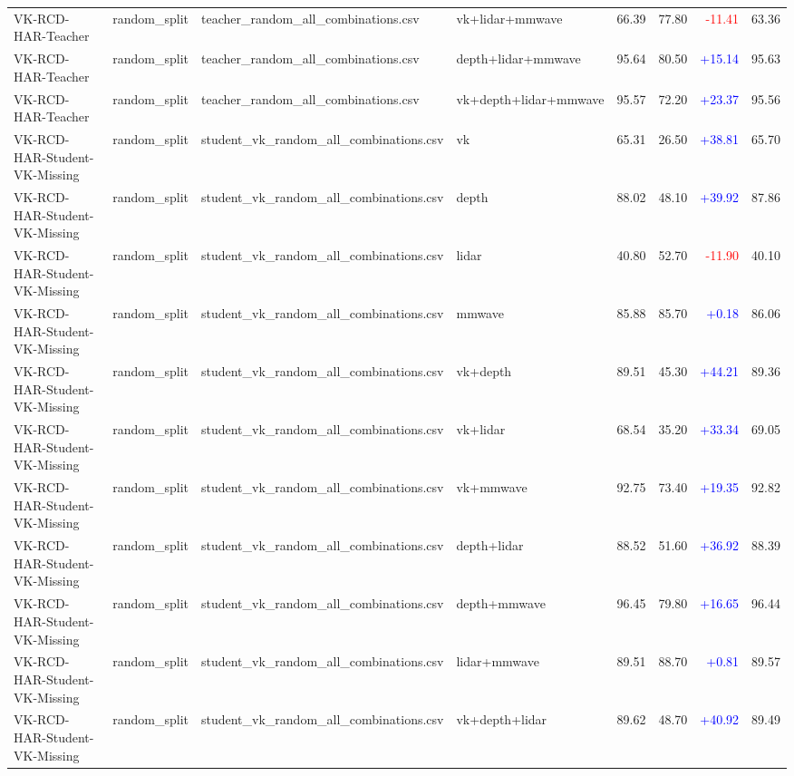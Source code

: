 \documentclass[10pt]{article}
\begin{document}
\begin{longtable}{llllrrrr}
VK-RCD-HAR-Teacher & random\_split & teacher\_random\_all\_combinations.csv & vk+lidar+mmwave & 66.39 & 77.80 & \textcolor{red}{-11.41} & 63.36\\
VK-RCD-HAR-Teacher & random\_split & teacher\_random\_all\_combinations.csv & depth+lidar+mmwave & 95.64 & 80.50 & \textcolor{blue}{+15.14} & 95.63\\
VK-RCD-HAR-Teacher & random\_split & teacher\_random\_all\_combinations.csv & vk+depth+lidar+mmwave & 95.57 & 72.20 & \textcolor{blue}{+23.37} & 95.56\\
VK-RCD-HAR-Student-VK-Missing & random\_split & student\_vk\_random\_all\_combinations.csv & vk & 65.31 & 26.50 & \textcolor{blue}{+38.81} & 65.70\\
VK-RCD-HAR-Student-VK-Missing & random\_split & student\_vk\_random\_all\_combinations.csv & depth & 88.02 & 48.10 & \textcolor{blue}{+39.92} & 87.86\\
VK-RCD-HAR-Student-VK-Missing & random\_split & student\_vk\_random\_all\_combinations.csv & lidar & 40.80 & 52.70 & \textcolor{red}{-11.90} & 40.10\\
VK-RCD-HAR-Student-VK-Missing & random\_split & student\_vk\_random\_all\_combinations.csv & mmwave & 85.88 & 85.70 & \textcolor{blue}{+0.18} & 86.06\\
VK-RCD-HAR-Student-VK-Missing & random\_split & student\_vk\_random\_all\_combinations.csv & vk+depth & 89.51 & 45.30 & \textcolor{blue}{+44.21} & 89.36\\
VK-RCD-HAR-Student-VK-Missing & random\_split & student\_vk\_random\_all\_combinations.csv & vk+lidar & 68.54 & 35.20 & \textcolor{blue}{+33.34} & 69.05\\
VK-RCD-HAR-Student-VK-Missing & random\_split & student\_vk\_random\_all\_combinations.csv & vk+mmwave & 92.75 & 73.40 & \textcolor{blue}{+19.35} & 92.82\\
VK-RCD-HAR-Student-VK-Missing & random\_split & student\_vk\_random\_all\_combinations.csv & depth+lidar & 88.52 & 51.60 & \textcolor{blue}{+36.92} & 88.39\\
VK-RCD-HAR-Student-VK-Missing & random\_split & student\_vk\_random\_all\_combinations.csv & depth+mmwave & 96.45 & 79.80 & \textcolor{blue}{+16.65} & 96.44\\
VK-RCD-HAR-Student-VK-Missing & random\_split & student\_vk\_random\_all\_combinations.csv & lidar+mmwave & 89.51 & 88.70 & \textcolor{blue}{+0.81} & 89.57\\
VK-RCD-HAR-Student-VK-Missing & random\_split & student\_vk\_random\_all\_combinations.csv & vk+depth+lidar & 89.62 & 48.70 & \textcolor{blue}{+40.92} & 89.49\\

\end{longtable}
\end{document}
